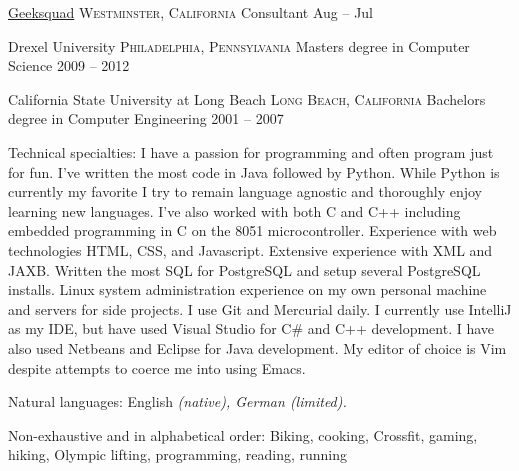 \documentclass[10pt,a4paper]{article}
\begin{document}
\headedsection
  {\href{http://www.geeksquad.com/}{Geeksquad}}
  {\textsc{Westminster, California}} {%
  \headedsubsection
  { Consultant}
    {Aug -- Jul}
    {}
}



\spacedhrule{-0.2em}{-0.4em}


\headedsection
  {Drexel University}
  {\textsc{Philadelphia, Pennsylvania}} {%
  \headedsubsection
    {Masters degree in Computer Science}
    {2009 -- 2012}
    {}
}

\headedsection
  {California State University at Long Beach}
  {\textsc{Long Beach, California}} {%
  \headedsubsection
    {Bachelors degree in Computer Engineering}
    {2001 -- 2007} 
    {}
}

\spacedhrule{0.5em}{-0.4em}


\inlineheadsection  %
  {Technical specialties:}
  {I have a passion for programming and often program just for fun. I've written the
  most code in Java followed by Python. While Python is currently my favorite
  I try to remain language agnostic and thoroughly enjoy learning new
  languages. I've also worked with both C and C++ including embedded programming
  in C on the 8051 microcontroller. Experience with web 
  technologies {HTML}, {CSS}, and {Javascript}. Extensive experience with
  {XML} and {JAXB}. Written the most {SQL} for {PostgreSQL} and setup several 
  {PostgreSQL} installs. Linux system administration experience on my 
  own personal machine and servers for side projects. I use {Git} and 
  Mercurial daily. I currently use IntelliJ as my IDE, but have used Visual 
  Studio for {C\#} and {C++} development. I have also used {Netbeans} and 
  {Eclipse} for Java development. My editor of choice is Vim despite 
  attempts to coerce me into using Emacs.}

\inlineheadsection
  {Natural languages:}
  {English \emph{(native), German \emph{(limited)}.}}


\spacedhrule{1.6em}{-0.4em}


\inlineheadsection
  {Non-exhaustive and in alphabetical order:}
  {Biking, cooking, Crossfit, gaming, hiking, Olympic lifting, programming, reading, running}
\end{document}
